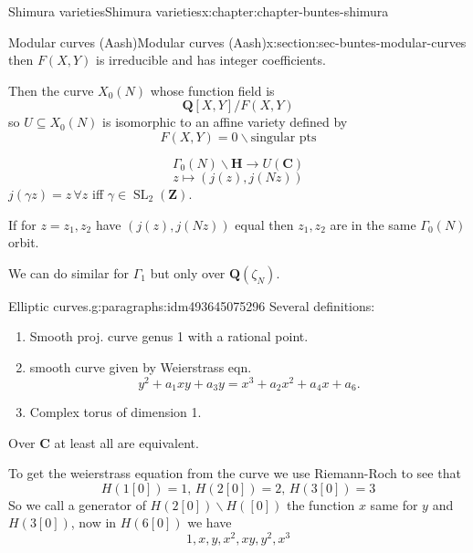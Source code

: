 \documentclass[oneside,10pt,]{book}
\numberwithin{equation}{section}
\newcommand{\lb}{[}
\newcommand{\rb}{]}
\newcommand{\ZZ}{\mathbf{Z}}
\newcommand{\QQ}{\mathbf{Q}}
\newcommand{\CC}{\mathbf{C}}
\newcommand{\HH}{\mathbf{H}}
\DeclareMathOperator{\SL}{SL}
\begin{document}
\begin{chapterptx}{Shimura varieties}{}{Shimura varieties}{}{}{x:chapter:chapter-buntes-shimura}
\begin{sectionptx}{Modular curves (Aash)}{}{Modular curves (Aash)}{}{}{x:section:sec-buntes-modular-curves}
\begin{equation*}
\end{equation*}
then \(F(X,Y)\) is irreducible and  has integer coefficients.%
\par
Then the curve \(X_0(N)\) whose function field is%
\begin{equation*}
\QQ \lb X,Y\rb/ F(X,Y)
\end{equation*}
so \(U \subseteq X_0(N)\) is isomorphic to an affine variety defined by%
\begin{equation*}
F(X,Y) = 0 \smallsetminus \text{singular pts}
\end{equation*}
%
\par
%
\begin{equation*}
\Gamma_0(N) \backslash \HH \to U(\CC)
\end{equation*}
%
\begin{equation*}
z \mapsto (j(z), j(Nz))
\end{equation*}
\(j(\gamma z) = z\,\forall z\) iff \(\gamma \in \SL_2(\ZZ)\).%
\par
If for \(z= z_1,z_2\) have \((j(z),j(Nz))\) equal then \(z_1,z_2\) are in the same \(\Gamma_0(N)\) orbit.%
\par
We can do similar for \(\Gamma_1\) but only over \(\QQ(\zeta_N)\).%
\begin{paragraphs}{Elliptic curves.}{g:paragraphs:idm493645075296}%
Several definitions:%
\begin{enumerate}
\item{}Smooth proj. curve genus 1 with a rational point.%
\item{}smooth curve given by Weierstrass eqn.%
\begin{equation*}
y^2 + a_1xy + a_3 y =  x^3 + a_2x^2 + a_4 x + a_6\text{.}
\end{equation*}
%
\item{}Complex torus of  dimension 1.%
\end{enumerate}
%
\par
Over \(\CC\) at least all are equivalent.%
\par
To get the weierstrass equation from the curve we use Riemann-Roch to see that%
\begin{equation*}
H(1[0]) = 1,\, H(2[0]) = 2,\,H(3[0]) =3
\end{equation*}
So we call a generator of \(H(2\lb 0 \rb) \smallsetminus H(\lb 0 \rb)\) the function \(x\) same for \(y\) and \(H(3\lb 0 \rb)\), now in \(H(6 \lb 0 \rb)\) we have%
\begin{equation*}
1,x,y,x^2 ,xy,y^2,x^3
\end{equation*}

\end{paragraphs}
\end{sectionptx}
\end{chapterptx}
\end{document}
